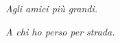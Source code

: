 \pagestyle{empty}
\begin{flushright}
  \emph{\large{Agli amici più grandi.}}

  \emph{\large{A chi ho perso per strada.}}
\end{flushright}
